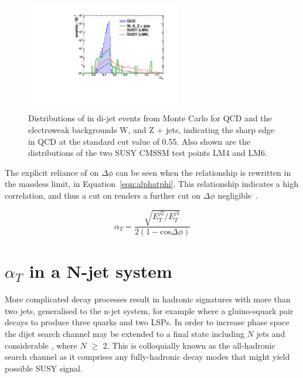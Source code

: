 \begin{figure}[htbp]
\begin{center}
\includegraphics[width=0.6\textwidth]{Figures/AlphaT/Thesis_dijet_ATPlot}
\caption[Distributions of \alt in di-jet events from Monte Carlo for QCD and the electroweak backgrounds W, \tto and Z + jets, indicating the sharp edge in QCD at the standard cut value of 0.55.]{\label{fig:atedgedi}Distributions of \alt in di-jet events from Monte Carlo for QCD and the electroweak backgrounds W, \tto and Z + jets, indicating the sharp edge in QCD at the standard cut value of 0.55. Also shown are the distributions of the two SUSY CMSSM test points LM4 and LM6.}
\end{center}
\end{figure}


The explicit reliance of \alt on $\Delta \phi$ can be seen when the relationship is rewritten in the massless limit, in Equation~\ref{eqn:alphatphi}. This relationship indicates a high correlation, and thus a cut on \alt renders a further cut on $\Delta \phi$ negligible~\cite{ANaT}.

\begin{equation}
\alpha_{T} = \frac{\sqrt{E_{T}^{j2}/E_{T}^{j1}}}{2(1- \textrm{cos} \Delta \phi)} 
\label{eqn:alphatphi}
\end{equation}


\section{$\alpha_{T}$ in a N-jet system}
More complicated decay processes result in hadronic signatures with more than two jets, generalised to the n-jet system, for example where a gluino-squark pair decays to produce three quarks and two LSPs. In order to increase phase space the dijet search channel may be extended to a final state including $N$ jets and considerable \met, where $N$ $\geq$ 2. This is colloquially known as the all-hadronic search channel as it comprises any fully-hadronic decay modes that might yield possible SUSY signal. 

